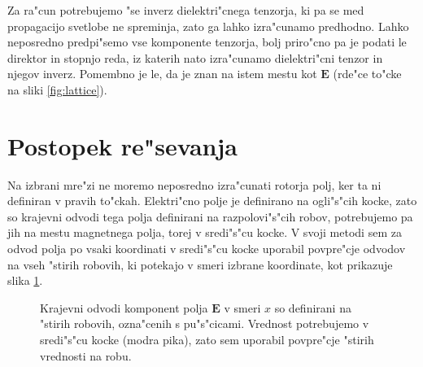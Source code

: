 \documentclass[12pt,twoside,openright,final]{report}
\renewcommand{\vec}{\mathbf}
\newcommand{\E}{\vec E}
\begin{document}
Za ra"cun potrebujemo "se inverz dielektri"cnega tenzorja, ki pa se med propagacijo svetlobe ne spreminja, zato ga lahko izra"cunamo predhodno. 
Lahko neposredno predpi"semo vse komponente tenzorja, bolj priro"cno pa je podati le direktor in stopnjo reda, iz katerih nato izra"cunamo dielektri"cni tenzor in njegov inverz. 
Pomembno je le, da je znan na istem mestu kot $\E$ (rde"ce to"cke na sliki \ref{fig:lattice}).

\section{Postopek re"sevanja}
Na izbrani mre"zi ne moremo neposredno izra"cunati rotorja polj, ker ta ni definiran v pravih to"ckah. 
Elektri"cno polje je definirano na ogli"s"cih kocke, zato so krajevni odvodi tega polja definirani na razpolovi"s"cih robov, potrebujemo pa jih na mestu magnetnega polja, torej v sredi"s"cu kocke. 
V svoji metodi sem za odvod polja po vsaki koordinati v sredi"s"cu kocke uporabil povpre"cje odvodov na vseh "stirih robovih, ki potekajo v smeri izbrane koordinate, kot prikazuje slika \ref{fig:lattice-derivatives}. 

\begin{figure}[h]
\centering
 \caption{
 Krajevni odvodi komponent polja $\E$ v smeri $x$ so definirani na "stirih robovih, ozna"cenih s pu"s"cicami. 
 Vrednost potrebujemo v sredi"s"cu kocke (modra pika), zato sem uporabil povpre"cje "stirih vrednosti na robu. 
 }
 \label{fig:lattice-derivatives}
\end{figure}
\end{document}
